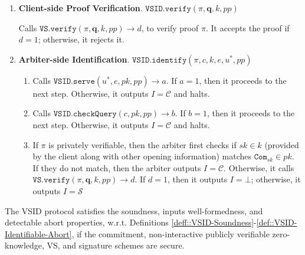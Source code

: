 \begin{enumerate}
\item\textbf{Client-side Proof Verification}. $\mathtt{VSID.verify}(\pi,\bm{q},k,{pp})$

Calls $\mathtt{VS.verify}(\pi,\bm{q},k,{pp})\rightarrow d$, to verify  proof $\pi$. It accepts the proof if $d=1$; otherwise, it rejects it. 




\item\textbf{Arbiter-side Identification}. $\mathtt{VSID.identify}(\pi,c,k,e,u^{\scriptscriptstyle *},{pp})$ 
\begin{enumerate}


\item\label{Arb-VSID.serve} Calls $\mathtt{VSID.serve}(u^{\scriptscriptstyle *},e,pk,{pp})\rightarrow a$. If $a=1$, then it proceeds to the next step. Otherwise, it outputs $I=\mathcal C$ and halts. 

\item Calls $\mathtt{VSID.checkQuery}(c, pk,{pp})\rightarrow b$. If $b=1$, then it proceeds to the next step. Otherwise, it outputs $I=\mathcal C$ and halts. 

\item  If $\pi$ is  privately verifiable, then the arbiter  first checks if $sk\in k$ (provided by the client along with other opening information) matches $\mathtt{Com}_{\scriptscriptstyle sk}\in pk$. If they do not match, then the arbiter outputs $I=\mathcal C$. Otherwise,  it calls $\mathtt{VS.verify}(\pi, \bm{q},k,{pp})\rightarrow d$. If $d=1$, then it outputs $I=\bot$; otherwise, it outputs $I=\mathcal S$
\end{enumerate}
\end{enumerate}




\begin{theorem}
The VSID protocol satisfies the soundness, inputs well-formedness, and detectable abort properties, w.r.t. Definitions \ref{deff::VSID-Soundness}-\ref{def::VSID-Identifiable-Abort}, if the commitment, non-interactive publicly verifiable zero-knowledge, VS, and signature schemes are secure. 
\end{theorem}

